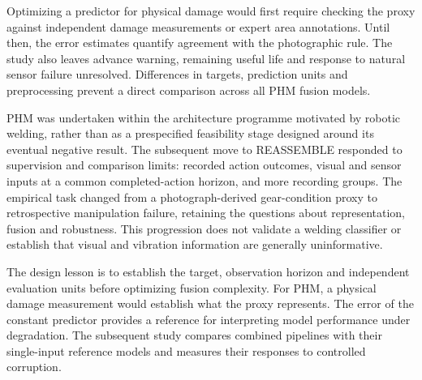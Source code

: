 Optimizing a predictor for physical damage would first require checking the proxy
against independent damage measurements or expert area annotations. Until then, the
error estimates quantify agreement with the photographic rule. The study also leaves
advance warning, remaining useful life and response to natural sensor failure
unresolved. Differences in targets, prediction units and preprocessing prevent a direct comparison
across all PHM fusion models.

PHM was undertaken within the architecture programme motivated by robotic welding,
rather than as a prespecified feasibility stage designed around its eventual negative
result. The subsequent move to REASSEMBLE responded to supervision and comparison
limits: recorded action outcomes, visual and sensor inputs at a common completed-action
horizon, and more recording groups. The empirical task changed from a photograph-derived
gear-condition proxy to retrospective manipulation failure, retaining the questions
about representation, fusion and robustness. This progression does not validate a
welding classifier or establish that visual and vibration information are generally
uninformative.

The design lesson is to establish the target, observation horizon and independent
evaluation units before optimizing fusion complexity. For PHM, a physical damage
measurement would establish what the proxy represents. The error of the constant
predictor provides a reference for interpreting model performance under degradation. The
subsequent study compares combined pipelines with their single-input reference models
and measures their responses to controlled corruption.
